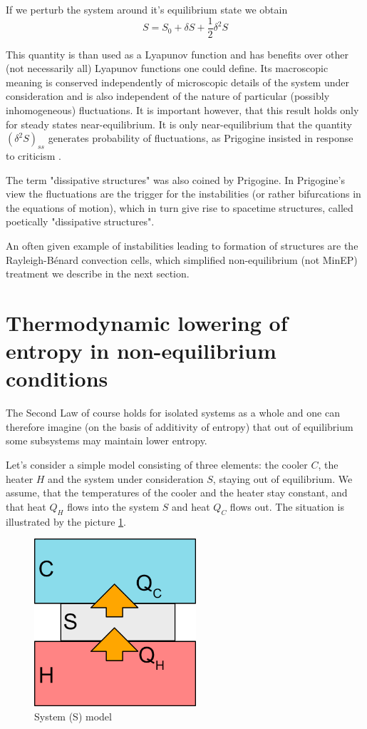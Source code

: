 \documentclass[a4paper,12pt]{article}
\begin{document}
If we perturb the system around it's equilibrium state we obtain
\begin{equation}
  S=S_0 + \delta S + \frac{1}{2}\delta^2 S
\end{equation}

This quantity is than used as a Lyapunov function and has benefits over other (not necessarily all) Lyapunov functions one could define. 
Its macroscopic meaning is conserved independently of microscopic details of the system under consideration and is also independent of the nature of particular (possibly inhomogeneous) fluctuations.
It is important however, that this result holds only for steady states near-equilibrium. It is only near-equilibrium that the quantity $ (\delta^2 S)_{ss} $ generates probability of fluctuations, as Prigogine insisted in response to criticism \cite{Nicolis:1979cv}. 

The term "dissipative structures" was also coined by Prigogine.
In Prigogine's view the fluctuations are the trigger for the instabilities (or rather bifurcations in the equations of motion), which in turn give rise to spacetime structures, called poetically "dissipative structures". 

An often given example of instabilities leading to formation of structures are the Rayleigh-Bénard convection cells, which simplified non-equilibrium (not MinEP) treatment we describe in the next section.

\section{Thermodynamic lowering of entropy in non-equilibrium conditions}
\label{simple-model}

The Second Law of course holds for isolated systems as a whole and one can therefore imagine (on the basis of additivity of entropy) that out of equilibrium some subsystems may maintain lower entropy.

Let's consider a simple model consisting of three elements: the cooler $C$, the heater $H$ and the system under consideration $S$, staying out of equilibrium.
We assume, that the temperatures of the cooler and the heater stay constant, and that heat $Q_H$ flows into the system $S$ and heat $Q_C$ flows out. The situation is illustrated by the picture \ref{Fig2}.
\begin{figure}[ht!]
\centering \includegraphics[width=6cm]{system} \caption{System (S) model}
\label{Fig2} 
\end{figure}
\end{document}
